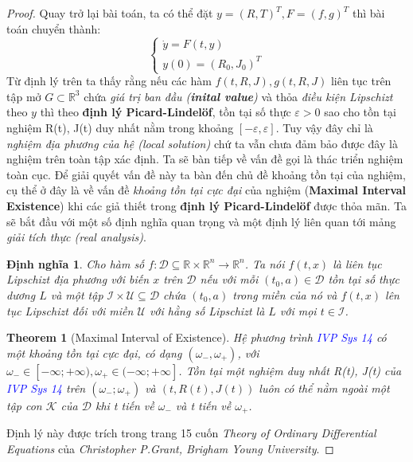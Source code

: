\documentclass[a4paper]{article}
\newtheorem{definition}{Định nghĩa}
\newtheorem{theorem}{{\bf Theorem}}
\begin{document}
\begin{proof}
\newline
Quay trở lại bài toán, ta có thể đặt $y = (R,T)^T,  F = (f,g)^T$ thì bài toán chuyển thành:
$$
\begin{cases}
    \dot{y} = F(t,y) \\
    y(0) = (R_0, J_0)^T
\end{cases}
$$
Từ định lý trên ta thấy rằng nếu các hàm $f(t, R, J), g(t, R, J)$ liên tục trên tập mở $G \subset \mathbb{R}^3$ chứa \textit{giá trị ban đầu (\textbf{inital value})} và thỏa \textit{điều kiện Lipschizt} theo $y$ thì theo \textbf{định lý Picard-Lindelöf}, tồn tại số thực $\varepsilon > 0$ sao cho tồn tại nghiệm R(t), J(t) duy nhất nằm trong khoảng $[-\varepsilon, \varepsilon]$. Tuy vậy đây chỉ là \textit{nghiệm địa phương của hệ (local solution)} chứ ta vẫn chưa đảm bảo được đây là nghiệm trên toàn tập xác định. 
\newline
\newline
Ta sẽ bàn tiếp về vấn đề gọi là thác triển nghiệm toàn cục. Để giải quyết vấn đề này ta bàn đến chủ đề khoảng tồn tại của nghiệm, cụ thể ở đây là về vấn đề \textit{khoảng tồn tại cực đại} của nghiệm (\textbf{Maximal Interval Existence}) khi các giả thiết trong \textbf{định lý Picard-Lindelöf} được thỏa mãn. Ta sẽ bắt đầu với một số định nghĩa quan trọng và một định lý liên quan tới mảng  \textit{giải tích thực (real analysis)}.
\begin{definition}
    Cho hàm số $ f: \mathcal{D} \subseteq \mathbb{R} \times \mathbb{R}^n \rightarrow \mathbb{R}^n $. Ta nói $f(t,x)$ là \textit{liên tục Lipschizt} địa phương với biến $x$ trên $\mathcal{D}$ nếu với mỗi $(t_0, a) \in \mathcal{D}$ tồn tại số thực dương $L$ và một tập $\mathcal{I} \times \mathcal{U} \subseteq \mathcal{D}$ chứa $(t_0, a)$ trong miền của nó và $f(t,x)$ lên tục Lipschizt đối với miền $\mathcal{U}$ với hằng số Lipschizt là $L$ với mọi $t \in \mathcal{I}$.
\end{definition}

\begin{theorem}[Maximal Interval of Existence]
    Hệ phương trình \textit{\textcolor{blue}{IVP Sys 14}} có một khoảng tồn tại cực đại, có dạng $(\omega_-, \omega_+)$, với $\omega_- \in [-\infty; +\infty), \omega_+ \in (-\infty; +\infty]$. Tồn tại một nghiệm duy nhất R(t), J(t) của \textit{\textcolor{blue}{IVP Sys 14}} trên $(\omega_-; \omega_+)$ và $(t, R(t), J(t))$ luôn có thể nằm ngoài một tập con $\mathcal{K}$ của $\mathcal{D}$ khi t tiến về $\omega_-$ và t tiến về $\omega_+$.
\end{theorem}
Định lý này được trích trong trang 15 cuốn \textit{Theory of Ordinary Differential Equations} của \textit{Christopher P.Grant, Brigham Young University}.


\end{proof}
\end{document}
